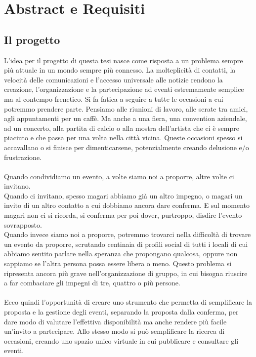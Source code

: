 \section{Abstract e Requisiti}

\subsection{Il progetto}

L'idea per il progetto di questa tesi nasce come risposta a un problema sempre più attuale in un mondo sempre più connesso.
La molteplicità di contatti, la velocità delle comunicazioni e l'accesso universale alle notizie 
rendono la creazione, l'organizzazione e la partecipazione ad eventi estremamente semplice ma al contempo frenetico.
Si fa fatica a seguire a tutte le occasioni a cui potremmo prendere parte.
Pensiamo alle riunioni di lavoro, alle serate tra amici, agli appuntamenti per un caffè.
Ma anche a una fiera, una convention aziendale, ad un concerto, alla partita di calcio o alla mostra dell'artista che ci è sempre piaciuto e che passa per una volta nella città vicina.
Queste occasioni spesso si accavallano o si finisce per dimenticarsene, potenzialmente creando delusione e/o frustrazione.\\
\\
Quando condividiamo un evento, a volte siamo noi a proporre, altre volte ci invitano. \\
Quando ci invitano, spesso magari abbiamo già un altro impegno, o magari un invito di un altro contatto a cui dobbiamo ancora dare conferma. 
E sul momento magari non ci si ricorda, si conferma per poi dover, purtroppo, disdire l'evento sovrapposto.\\
Quando invece siamo noi a proporre, potremmo trovarci nella difficoltà di trovare un evento da proporre, 
scrutando centinaia di profili social di tutti i locali di cui abbiamo sentito parlare nella speranza che propongano qualcosa, 
oppure non sappiamo se l'altra persona possa essere libera o meno. 
Questo problema si ripresenta ancora più grave nell'organizzazione di gruppo, in cui bisogna riuscire a far combaciare gli impegni di tre, quattro o più persone.\\
\\
Ecco quindi l'opportunità di creare uno strumento che permetta di semplificare la proposta e la gestione degli eventi, 
separando la proposta dalla conferma, per dare modo di valutare l'effettiva disponibilità ma anche rendere più facile un'invito a partecipare.
Allo stesso modo si può semplificare la ricerca di occasioni, creando uno spazio unico virtuale in cui pubblicare e consultare gli eventi.\\
